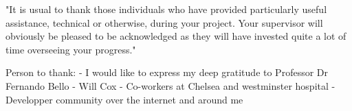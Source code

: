 "It is usual to thank those individuals who have provided particularly useful assistance, technical or otherwise, during your project. Your supervisor will obviously be pleased to be acknowledged as they will have invested quite a lot of time overseeing your progress."

Person to thank:
\newline \vspace{5mm}
- I would like to express my deep gratitude to Professor Dr Fernando Bello
\newline \vspace{5mm}
- Will Cox
\newline \vspace{5mm}
- Co-workers at Chelsea and westminster hospital
\newline \vspace{5mm}
- Developper community over the internet and around me 
\newline \vspace{5mm}

